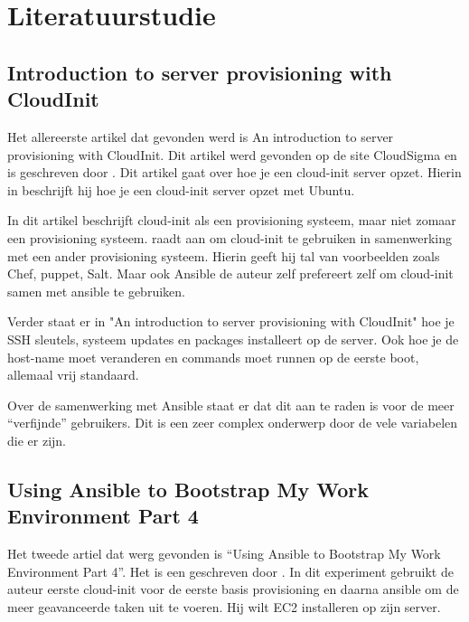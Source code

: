 



\section{Literatuurstudie}
\label{sec:state-of-the-art}
\subsection{Introduction to server provisioning with CloudInit}
Het allereerste artikel dat gevonden werd is An introduction to server provisioning with CloudInit. Dit artikel werd gevonden op de site CloudSigma en is geschreven door \textcite{Cloudsigma}. Dit artikel gaat over hoe je een cloud-init server opzet. Hierin in beschrijft hij hoe je een cloud-init server opzet met Ubuntu. 

In dit artikel beschrijft \textcite{Cloudsigma} cloud-init als een provisioning systeem, maar niet zomaar een provisioning systeem. \textcite{Cloudsigma} raadt aan om cloud-init te gebruiken in samenwerking met een ander provisioning systeem. Hierin geeft hij tal van voorbeelden zoals Chef, puppet, Salt. Maar ook Ansible de auteur zelf prefereert zelf om cloud-init samen met ansible te gebruiken.

Verder staat er in "An introduction to server provisioning with CloudInit" hoe je SSH sleutels, systeem updates en packages installeert op de server. Ook hoe je de host-name moet veranderen en commands moet runnen op de eerste boot, allemaal vrij standaard. 

Over de samenwerking met Ansible staat er dat dit aan te raden is voor de meer “verfijnde” gebruikers. Dit is een zeer complex onderwerp door de vele variabelen die er zijn.


\subsection{Using Ansible to Bootstrap My Work Environment Part 4}
Het tweede artiel dat werg gevonden is “Using Ansible to Bootstrap My Work Environment Part 4”.  Het is een geschreven door \textcite{scottharney}. In dit experiment gebruikt de auteur eerste cloud-init voor de eerste basis provisioning en daarna ansible om de meer geavanceerde taken uit te voeren. Hij wilt EC2 installeren op zijn server.

